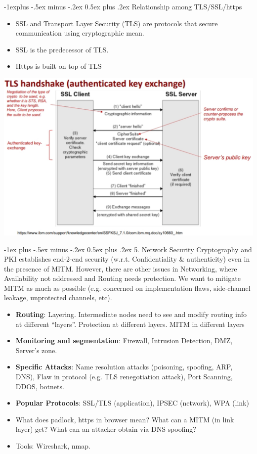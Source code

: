 \documentclass[10pt, landscape]{article}
\makeatletter
\renewcommand{\section}{\@startsection{section}{1}{0mm}%
                                {-1ex plus -.5ex minus -.2ex}%
                                {0.5ex plus .2ex}%
                                {\normalfont\large\bfseries}}
\renewcommand{\subsection}{\@startsection{subsection}{2}{0mm}%
                                {-1explus -.5ex minus -.2ex}%
                                {0.5ex plus .2ex}%
                                {\normalfont\normalsize\bfseries}}
\makeatother
\begin{document}
\begin{multicols*}{3}
\subsection{Relationship among TLS/SSL/https}
\begin{itemize}
\item SSL and Transport Layer Security (TLS) are protocols that secure communication using cryptographic mean. 
\item SSL is the predecessor of TLS. 
\item Https is built on top of TLS
\end{itemize}
\centerline{\includegraphics[width=0.9\linewidth]{tls4}}


\columnbreak 
\vfill\null
\columnbreak

\section{5. Network Security}
Cryptography and PKI establishes end-2-end security (w.r.t. Confidentiality \& authenticity) even in the presence of MITM. However, there are other issues in Networking, where Availability not addressed and Routing needs protection. We want to mitigate MITM as much as possible (e.g. concerned on implementation flaws, side-channel leakage, unprotected channels, etc).
\begin{itemize}
\item \textbf{Routing}: Layering. Intermediate nodes need to see and modify routing info at different “layers”. Protection at different layers. MITM in different layers
\item \textbf{Monitoring and segmentation}: Firewall, Intrusion Detection, DMZ, Server’s zone.
\item \textbf{Specific Attacks}: Name resolution attacks (poisoning, spoofing, ARP, DNS), Flaw in protocol (e.g. TLS renegotiation attack), Port Scanning, DDOS, botnets.
\item \textbf{Popular Protocols}: SSL/TLS (application), IPSEC (network), WPA (link)
\item What does padlock, https in browser mean? What can a MITM (in link layer) get? What can an attacker obtain via DNS spoofing?
\item Tools: Wireshark, nmap.
\end{itemize}


\end{multicols*}
\end{document}
